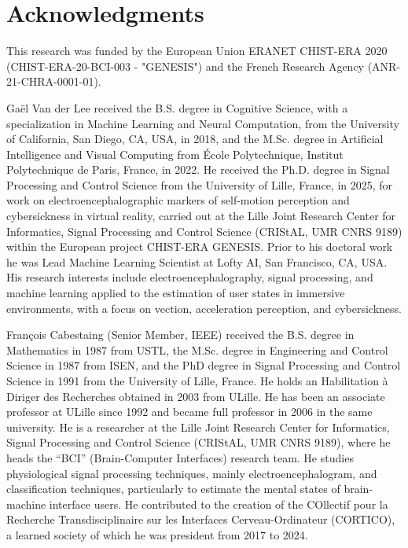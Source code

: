 \documentclass[lettersize,journal]{IEEEtran}
\begin{document}
\section*{Acknowledgments}
This research was funded by the European Union ERANET CHIST-ERA 2020 (CHIST-ERA-20-BCI-003 - "GENESIS") and the French Research Agency (ANR-21-CHRA-0001-01).




\begin{IEEEbiographynophoto}{Gaël Van der Lee}
received the B.S. degree in Cognitive Science, with a specialization in Machine Learning and Neural Computation, from the University of California, San Diego, CA, USA, in 2018, and the M.Sc. degree in Artificial Intelligence and Visual Computing from \'{E}cole Polytechnique, Institut Polytechnique de Paris, France, in 2022. He received the Ph.D. degree in Signal Processing and Control Science from the University of Lille, France, in 2025, for work on electroencephalographic markers of self-motion perception and cybersickness in virtual reality, carried out at the Lille Joint Research Center for Informatics, Signal Processing and Control Science (CRIStAL, UMR CNRS 9189) within the European project CHIST-ERA GENESIS. Prior to his doctoral work he was Lead Machine Learning Scientist at Lofty AI, San Francisco, CA, USA. His research interests include electroencephalography, signal processing, and machine learning applied to the estimation of user states in immersive environments, with a focus on vection, acceleration perception, and cybersickness.
\end{IEEEbiographynophoto}

\begin{IEEEbiographynophoto}{Fran\c{c}ois Cabestaing}
(Senior Member, IEEE) received the B.S. degree in Mathematics in 1987 from USTL, the M.Sc. degree in Engineering and Control Science in 1987 from ISEN, and the PhD degree in Signal Processing and Control Science in 1991 from the University of Lille, France. He holds an Habilitation \`a Diriger des Recherches obtained in 2003 from ULille. He has been an associate professor at ULille since 1992 and became full professor in 2006 in the same university. He is a researcher at the Lille Joint Research Center for Informatics, Signal Processing and Control Science (CRIStAL, UMR CNRS 9189), where he heads the ``BCI'' (Brain-Computer Interfaces) research team. He studies physiological signal processing techniques, mainly electroencephalogram, and classification techniques, particularly to estimate the mental states of brain-machine interface users. He contributed to the creation of the COllectif pour la Recherche Transdisciplinaire sur les Interfaces Cerveau-Ordinateur (CORTICO), a learned society of which he was president from 2017 to 2024.
\end{IEEEbiographynophoto}
\end{document}
